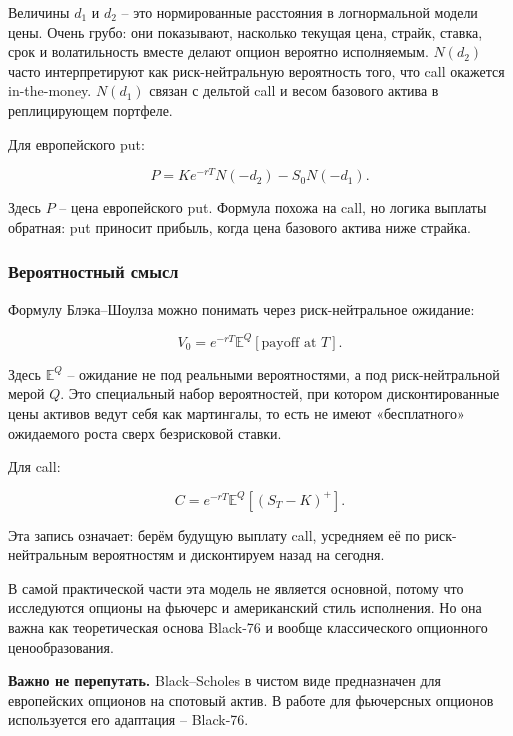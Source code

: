\documentclass[11pt,a4paper]{article}
\newcommand{\warn}[1]{%
  \vspace{0.15em}
  \noindent\colorbox{softred}{%
    \parbox{\dimexpr\linewidth-2\fboxsep\relax}{\textbf{Важно не перепутать.} #1}%
  }\vspace{0.2em}
}
\begin{document}
Величины $d_1$ и $d_2$ -- это нормированные расстояния в логнормальной модели цены. Очень грубо: они показывают, насколько текущая цена, страйк, ставка, срок и волатильность вместе делают опцион вероятно исполняемым. $N(d_2)$ часто интерпретируют как риск-нейтральную вероятность того, что call окажется in-the-money. $N(d_1)$ связан с дельтой call и весом базового актива в реплицирующем портфеле.

Для европейского put:

\begin{equation}
P=Ke^{-rT}N(-d_2)-S_0N(-d_1).
\end{equation}

Здесь $P$ -- цена европейского put. Формула похожа на call, но логика выплаты обратная: put приносит прибыль, когда цена базового актива ниже страйка.

\subsubsection{Вероятностный смысл}

Формулу Блэка--Шоулза можно понимать через риск-нейтральное ожидание:

\begin{equation}
V_0=e^{-rT}\mathbb{E}^{Q}\left[\text{payoff at }T\right].
\end{equation}

Здесь $\mathbb{E}^{Q}$ -- ожидание не под реальными вероятностями, а под риск-нейтральной мерой $Q$. Это специальный набор вероятностей, при котором дисконтированные цены активов ведут себя как мартингалы, то есть не имеют «бесплатного» ожидаемого роста сверх безрисковой ставки.

Для call:

\begin{equation}
C=e^{-rT}\mathbb{E}^{Q}\left[(S_T-K)^+\right].
\end{equation}

Эта запись означает: берём будущую выплату call, усредняем её по риск-нейтральным вероятностям и дисконтируем назад на сегодня.

В самой практической части эта модель не является основной, потому что исследуются опционы на фьючерс и американский стиль исполнения. Но она важна как теоретическая основа Black-76 и вообще классического опционного ценообразования.

\warn{Black--Scholes в чистом виде предназначен для европейских опционов на спотовый актив. В работе для фьючерсных опционов используется его адаптация -- Black-76.}
\end{document}
